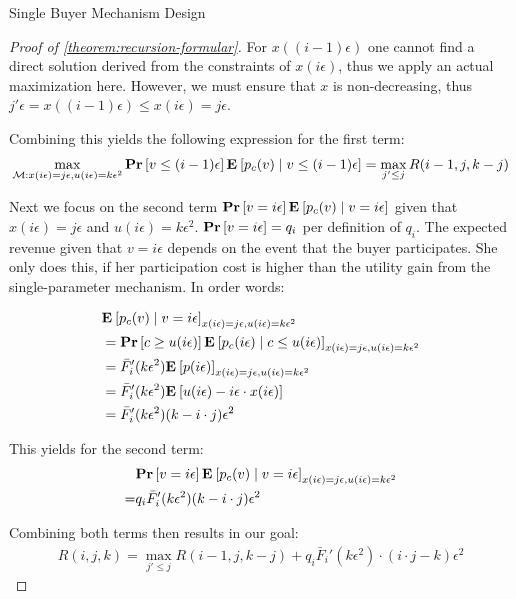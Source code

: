 \documentclass[11pt,a4paper]{article}
\renewcommand{\Pr}[1]{\mbox{\rm\bf Pr}\left[#1\right]}
\newcommand{\Ex}[2][]{\mbox{\rm\bf E}_{#1}\left[#2\right]}
\newcommand{\1}[1]{\mbox{\rm\bf 1}_{#1}}
\begin{document}
\begin{section}{Single Buyer Mechanism Design}
\begin{proof}[Proof of \autoref{theorem:recursion-formular}]
     For $x((i - 1)\epsilon)$ one cannot find a direct solution derived from the constraints of $x(i\epsilon)$, thus we apply an actual maximization here.
     However, we must ensure that $x$ is non-decreasing, thus $j' \epsilon = x((i-1)\epsilon) \leq x(i\epsilon) = j\epsilon$.

     Combining this yields the following expression for the first term:
     \begin{align*}
         \max_{\mathcal{M}: x(i\epsilon) = j\epsilon, u(i\epsilon) = k \epsilon^2} \Pr{v \leq (i-1)\epsilon} \Ex{p_c(v) \mid v \leq (i - 1) \epsilon} = \max_{j' \leq j} R(i-1, j, k - j)
     \end{align*}

     Next we focus on the second term $\Pr{v = i \epsilon} \Ex{p_c(v) \mid v = i \epsilon}$ given that $x(i\epsilon) = j\epsilon$ and $u(i\epsilon) = k\epsilon^2$.
     $\Pr{v = i \epsilon} = q_i$ per definition of $q_i$.
     The expected revenue given that $v = i \epsilon$ depends on the event that the buyer participates.
     She only does this, if her participation cost is higher than the utility gain from the single-parameter mechanism.
     In order words:

     \begin{align*}
          & \Ex{p_c(v) \mid v = i \epsilon}_{x(i\epsilon) = j \epsilon, u(i\epsilon) = k\epsilon^2}                                         \\
          & = \Pr{c \geq u(i\epsilon)} \Ex{p_c(i\epsilon) \mid c \leq u(i\epsilon)}_{x(i\epsilon) = j \epsilon, u(i\epsilon) = k\epsilon^2} \\
          & = \bar{F}_i'(k\epsilon^2) \Ex{p(i\epsilon)}_{x(i\epsilon) = j \epsilon, u(i\epsilon) = k\epsilon^2}                             \\
          & = \bar{F}_i'(k\epsilon^2) \Ex{u(i\epsilon) - i\epsilon \cdot x(i\epsilon)}                                                      \\
          & = \bar{F}_i'(k\epsilon^2) (k - i \cdot j)\epsilon^2                                                                             \\
     \end{align*}

     This yields for the second term:
     \begin{align*}
           & \Pr{v = i \epsilon} \Ex{p_c(v) \mid v = i \epsilon}_{x(i\epsilon) = j \epsilon, u(i\epsilon) = k\epsilon^2} \\
         = & q_i \bar{F}_i'(k\epsilon^2) (k - i \cdot j)\epsilon^2
     \end{align*}

     Combining both terms then results in our goal:
     \begin{align*}
         R(i,j,k) = \max_{j' \leq j} R(i-1, j, k - j) + q_i \bar{F}_i'(k \epsilon^2) \cdot (i\cdot j - k)\epsilon^2
     \end{align*}
 \end{proof}

\end{section}

\end{document}
